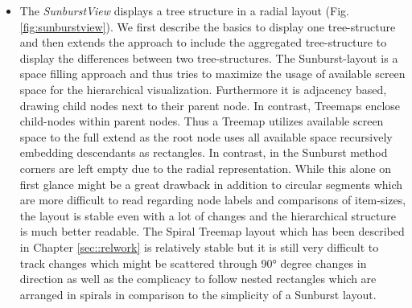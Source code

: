 \begin{itemize}
A legend which describes the color $\leftrightarrow$ change mapping is currently only available from within the \emph{SunburstView} which is described next. However this is only an implementation detail and a help-dialog will be added in future releases. Exemplary a side-by-side view with the \emph{SunburstView} is depicted in Fig. \ref{fig:sunbursttextview} whereas the first inserted subtree is also visible in the \emph{TextView} area, marked by a blue background-color. 

While the \emph{SunburstView} provides a great overview about the whole tree-structure and subtrees, the \emph{TextView} provides a better detailed view on selected subtrees. Other deficiencies meantioned in the introduction regarding the boundary of nodes and XML-specific details do not apply as we compare the tree-structure, instead of a character based comparsion, with the ID-based diff-algorithm in the first place. Besides the lack of an appropriate overview, which is one of the advantages of the \emph{SunburstView}, the \emph{TextView} is an ideal partner to the \emph{SunburstView} as the XML text-serialization is better readable than radial Sunburst labels.

The diff-algorithm is only ever called once for every visible view\footnote{the only exception are small multiple displays which represents changes among several tree-structures}. The diff-tuples are then broadcasted to all other views which are capable of displaying the aggregated tree-structure.

\item
The \emph{SunburstView} displays a tree structure in a radial layout (Fig. \ref{fig:sunburstview}). We first describe the basics to display one tree-structure and then extends the approach to include the aggregated tree-structure to display the differences between two tree-structures. The Sunburst-layout is a space filling approach and thus tries to maximize the usage of available screen space for the hierarchical visualization. Furthermore it is adjacency based, drawing child nodes next to their parent node. In contrast, Treemaps enclose child-nodes within parent nodes. Thus a Treemap utilizes available screen space to the full extend as the root node uses all available space recursively embedding descendants as rectangles. In contrast, in the Sunburst method corners are left empty due to the radial representation. While this alone on first glance might be a great drawback in addition to circular segments which are more difficult to read regarding node labels and comparisons of item-sizes, the layout is stable even with a lot of changes and the hierarchical structure is much better readable. The Spiral Treemap layout which has been described in Chapter \ref{sec::relwork} is relatively stable but it is still very difficult to track changes which might be scattered through 90° degree changes in direction as well as the complicacy to follow nested rectangles which are arranged in spirals in comparison to the simplicity of a Sunburst layout.


\end{itemize}
